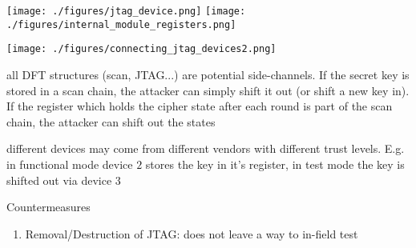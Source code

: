\documentclass[landscape, a4paper]{article}
\begin{document}
\begin{minipage}[t]{0.2\linewidth}
	\begin{betterlist}
		\item
		\begin{minipage}[b]{0.3\linewidth}
			\texttt{[image: ./figures/jtag\_device.png]}
			\texttt{[image: ./figures/internal\_module\_registers.png]}
		\end{minipage}
		\begin{minipage}[b]{0.7\linewidth}
			\texttt{[image: ./figures/connecting\_jtag\_devices2.png]}
		\end{minipage}
	\end{betterlist}
	\begin{betterlist}
		\item all DFT structures (scan, JTAG...) are potential side-channels. If the secret key is stored in a scan chain, the attacker can simply shift it out (or shift a new key in). If the register which holds the cipher state after each round is part of the scan chain, the attacker can shift out the states
		\begin{betterlist}
			\item different devices may come from different vendors with different trust levels. E.g. in functional mode device $2$ stores the key in it's register, in test mode the key is shifted out via device $3$
		\end{betterlist}
		\item \alert{Countermeasures}
		\begin{enumerate}
			\item \alert{Removal/Destruction of JTAG:} does not leave a way to in-field test
\end{enumerate}
\end{betterlist}
\end{minipage}
\end{document}
